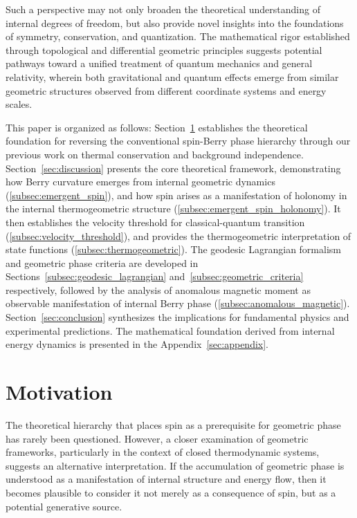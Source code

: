 \documentclass[%
 reprint,
 amsmath,amssymb,
 aps,
]{revtex4-1}
\numberwithin{equation}{section}%
\begin{document}
Such a perspective may not only broaden the theoretical understanding of internal degrees of freedom, but also provide novel insights into the foundations of symmetry, conservation, and quantization. The mathematical rigor established through topological and differential geometric principles suggests potential pathways toward a unified treatment of quantum mechanics and general relativity, wherein both gravitational and quantum effects emerge from similar geometric structures observed from different coordinate systems and energy scales.

This paper is organized as follows: Section~\ref{sec:motivation} establishes the theoretical foundation for reversing the conventional spin-Berry phase hierarchy through our previous work on thermal conservation and background independence. Section~\ref{sec:discussion} presents the core theoretical framework, demonstrating how Berry curvature emerges from internal geometric dynamics (\ref{subsec:emergent_spin}), and how spin arises as a manifestation of holonomy in the internal thermogeometric structure (\ref{subsec:emergent_spin_holonomy}). It then establishes the velocity threshold for classical-quantum transition (\ref{subsec:velocity_threshold}), and provides the thermogeometric interpretation of state functions (\ref{subsec:thermogeometric}). The geodesic Lagrangian formalism and geometric phase criteria are developed in Sections~\ref{subsec:geodesic_lagrangian} and~\ref{subsec:geometric_criteria} respectively, followed by the analysis of anomalous magnetic moment as observable manifestation of internal Berry phase (\ref{subsec:anomalous_magnetic}). Section~\ref{sec:conclusion} synthesizes the implications for fundamental physics and experimental predictions. The mathematical foundation derived from internal energy dynamics is presented in the Appendix~\ref{sec:appendix}.


\section{Motivation} \label{sec:motivation}

The theoretical hierarchy that places spin as a prerequisite for geometric phase has rarely been questioned. However, a closer examination of geometric frameworks, particularly in the context of closed thermodynamic systems, suggests an alternative interpretation. If the accumulation of geometric phase is understood as a manifestation of internal structure and energy flow, then it becomes plausible to consider it not merely as a consequence of spin, but as a potential generative source.
\end{document}
